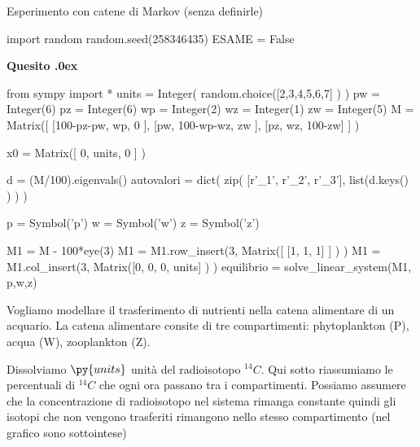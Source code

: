 \documentclass[11pt,twoside,a4paper]{article}
\newcounter{quesito}
\newenvironment{question}{\bigskip\addtocounter{quesito}{1}\bigskip\bigskip\par\textbf{Quesito \thequesito.\kern0ex}}{\par\vspace{\parskip}}
\begin{document}
\colorbox{blue!10}{\begin{minipage}{\textwidth}
Esperimento con catene di Markov (senza definirle)

\end{minipage}}


\begin{pycode}
import random
random.seed(258346435)
ESAME = False
\end{pycode}


\begin{question}
\def\Pr{{\rm Pr\,}}
\def\pyl#1{\py{latex(#1)}}
\everymath{\displaystyle}
\renewcommand{\arraystretch}{2}
\begin{pycode}
from sympy import *
units = Integer( random.choice([2,3,4,5,6,7] ) )
pw =  Integer(6)
pz =  Integer(6)
wp =  Integer(2)
wz =  Integer(1)
zw =  Integer(5)
M = Matrix([ [100-pz-pw, wp,        0     ],
             [pw,        100-wp-wz, zw    ],
             [pz,        wz,        100-zw] ] )

x0 = Matrix([ 0, units, 0 ] )

d = (M/100).eigenvals()
autovalori = dict( zip( [r'\lambda_1', r'\lambda_2', r'\lambda_3'], list(d.keys() ) ) )

p = Symbol('p')
w = Symbol('w')
z = Symbol('z')


M1 = M - 100*eye(3)
M1 = M1.row_insert(3, Matrix([ [1, 1, 1] ] ) )
M1 = M1.col_insert(3, Matrix([0, 0, 0, units] ) )
equilibrio = solve_linear_system(M1, p,w,z)

\end{pycode}
Vogliamo modellare il trasferimento di nutrienti nella catena alimentare di un acquario. La catena alimentare consite di tre compartimenti: phytoplankton ({\sf P}), acqua ({\sf W}), zooplankton ({\sf Z}).

Dissolviamo $\py{units}$ unità del radioisotopo $^{14}C$. Qui sotto riassumiamo le percentuali di $^{14}C$ che ogni ora passano tra i compartimenti. Possiamo assumere che la concentrazione di radioisotopo nel sistema rimanga constante quindi gli isotopi che non vengono trasferiti rimangono nello stesso compartimento (nel grafico sono sottointese)

\hfil
{}
\end{question}
\end{document}
